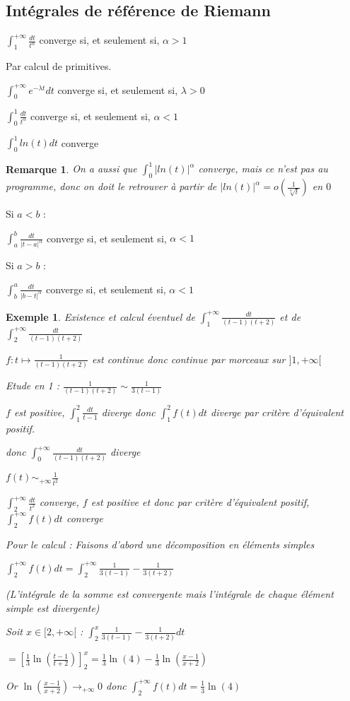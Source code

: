 \documentclass[a4paper,12pt]{book}
\newcommand{\Prop}[2]{\begin{tcolorbox}[sharp corners, colback=white,colframe=red!90!black!75, title=Proposition : #1]#2\end{tcolorbox}}
\newcommand{\Pre}[1]{\begin{tcolorbox}[sharp corners, colback=white,colframe=green!60!green!30!black!75, title=Preuve]#1\end{tcolorbox}}
\newtheorem{Exe}{Exemple}[section]
\newtheorem{Rem}{Remarque}[section]
\begin{document}
\subsection{Intégrales de référence de Riemann}
\Prop{}{$\int_1^{+\infty}\frac{dt}{t^\alpha}$ converge si, et seulement si, $\alpha>1$}
\Pre{Par calcul de primitives.}
\Prop{}{$\int_0^{+\infty}e^{-\lambda t}dt$ converge si, et seulement si, $\lambda>0$}
\Prop{}{$\int_0^1\frac{dt}{t^\alpha}$ converge si, et seulement si, $\alpha<1$}
\Prop{}{$\int_0^1ln(t)dt$ converge}
\begin{Rem}
On a aussi que $\int_0^1\vert ln(t)\vert^\alpha$ converge, mais ce n'est pas au programme, donc on doit le retrouver à partir de $\vert ln(t)\vert^\alpha =o\left(\frac{1}{\sqrt[\alpha]{t}}\right)$ en $0$
\end{Rem}
\Prop{}{Si $a<b$ : \par $\int_a^b\frac{dt}{\vert t-a\vert^\alpha}$ converge si, et seulement si, $\alpha<1$}
\Prop{}{Si $a>b$ : \par $\int_b^a\frac{dt}{\vert b-t\vert^\alpha}$ converge si, et seulement si, $\alpha<1$}
\begin{Exe}
Existence et calcul éventuel de $\int_1^{+\infty}\frac{dt}{(t-1)(t+2)}$ et de $\int_2^{+\infty}\frac{dt}{(t-1)(t+2)}$ \par $f:t\mapsto \frac{1}{(t-1)(t+2)}$ est continue donc continue par morceaux sur $]1,+\infty[$ \par Etude en 1 : $\frac{1}{(t-1)(t+2)}\sim\frac{1}{3(t-1)}$ \par $f$ est positive, $\int_1^2\frac{dt}{t-1}$ diverge donc $\int_1^2f(t)dt$ diverge par critère d'équivalent positif. \par donc $\int_0^{+\infty}\frac{dt}{(t-1)(t+2)}$ diverge
\par $f(t)\sim_{+\infty}\frac{1}{t^2}$ \par $\int_2^{+\infty}\frac{dt}{t^2}$ converge, $f$ est positive et donc par critère d'équivalent positif, $\int_2^{+\infty}f(t)dt$ converge \par Pour le calcul : Faisons d'abord une décomposition en éléments simples \par $\int_2^{+\infty}f(t)dt = \int_2^{+\infty} \frac{1}{3(t-1)}-\frac{1}{3(t+2)}$ \par (L'intégrale de la somme est convergente mais l'intégrale de chaque élément simple est divergente) \par Soit $x\in[2,+\infty[$ : $\int_2^x\frac{1}{3(t-1)}-\frac{1}{3(t+2)}dt$ \par $=\left[\frac{1}{3}\ln\left(\frac{t-1}{t+2}\right)\right]_2^x = \frac{1}{3}\ln(4)-\frac{1}{3}\ln\left(\frac{x-1}{x+2}\right)$ \par Or $\ln\left(\frac{x-1}{x+2}\right)\to_{+\infty}0$ donc $\int_2^{+\infty}f(t)dt =\frac{1}{3}\ln(4)$
\end{Exe}
\end{document}
